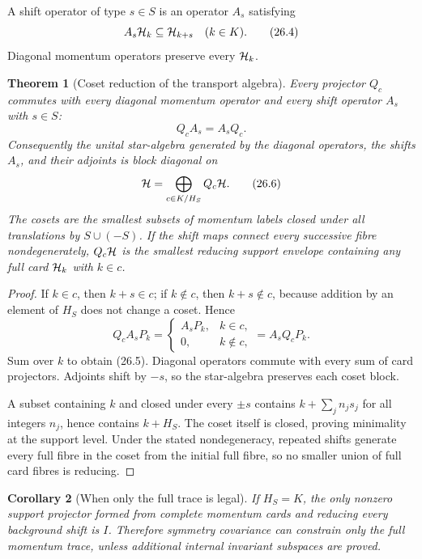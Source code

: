 \documentclass[11pt]{article}
\newtheorem{theorem}{Theorem}[section]
\newtheorem{corollary}[theorem]{Corollary}
\theoremstyle{remark}
\begin{document}
A shift operator of type \(s\in S\) is an operator \(A_s\) satisfying
\[
                         A_s{\cal H}_k\subseteq{\cal H}_{k+s}
 \quad(k\in K).                                             \tag{26.4}
\]
Diagonal momentum operators preserve every \({\cal H}_k\).

\begin{theorem}[Coset reduction of the transport algebra]
\label{thm:v12v26-cosets}
Every projector \(Q_c\) commutes with every diagonal momentum
operator and every shift operator \(A_s\) with \(s\in S\):
\[
                         Q_cA_s=A_sQ_c.                     \tag{26.5}
\]
Consequently the unital star-algebra generated by the diagonal
operators, the shifts \(A_s\), and their adjoints is block diagonal
on
\[
                         {\cal H}=\bigoplus_{c\in K/H_S}Q_c{\cal H}.
                                                               \tag{26.6}
\]
The cosets are the smallest subsets of momentum labels closed under
all translations by \(S\cup(-S)\).  If the shift maps connect every
successive fibre nondegenerately, \(Q_c{\cal H}\) is the smallest
reducing support envelope containing any full card
\({\cal H}_k\) with \(k\in c\).
\end{theorem}

\begin{proof}
If \(k\in c\), then \(k+s\in c\); if \(k\notin c\), then
\(k+s\notin c\), because addition by an element of \(H_S\) does not
change a coset.  Hence
\[
 Q_cA_sP_k=
 \begin{cases}
 A_sP_k,&k\in c,\\
 0,&k\notin c,
 \end{cases}
 =
 A_sQ_cP_k.
\]
Sum over \(k\) to obtain (26.5).  Diagonal operators commute with
every sum of card projectors.  Adjoints shift by \(-s\), so the
star-algebra preserves each coset block.

A subset containing \(k\) and closed under every \(\pm s\) contains
\(k+\sum_jn_js_j\) for all integers \(n_j\), hence contains
\(k+H_S\).  The coset itself is closed, proving minimality at the
support level.  Under the stated nondegeneracy, repeated shifts
generate every full fibre in the coset from the initial full fibre,
so no smaller union of full card fibres is reducing.
\end{proof}

\begin{corollary}[When only the full trace is legal]
\label{cor:v12v26-full}
If \(H_S=K\), the only nonzero support projector formed from complete
momentum cards and reducing every background shift is \(I\).
Therefore symmetry covariance can constrain only the full momentum
trace, unless additional internal invariant subspaces are proved.
\end{corollary}
\end{document}

